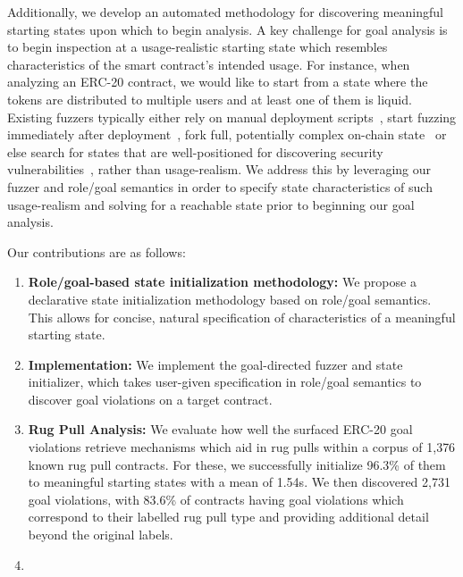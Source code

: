 Additionally, we develop an automated methodology for discovering meaningful starting states upon which to begin analysis.
A key challenge for goal analysis is to begin inspection at a usage-realistic starting state which resembles characteristics of the smart contract's intended usage.
For instance, when analyzing an ERC-20 contract, we would like to start from a state where the tokens are distributed to multiple users and at least one of them is liquid.
Existing fuzzers typically either
    rely on manual deployment scripts~\cite{foundry_fuzz,echidna},
    start fuzzing immediately after deployment~\cite{sfuzz_icse20,contractfuzzer_2018,echidna},
    fork full, potentially complex on-chain state~\cite{echidna,medusa,ityfuzz_issta23}
    or else search for states that are well-positioned for discovering security vulnerabilities~\cite{smartian_ase21,ConFuzzius_eurosp21,ityfuzz_issta23}, rather than usage-realism.
We address this by leveraging our fuzzer and role/goal semantics in order to specify state characteristics of such usage-realism and solving for a reachable
state prior to beginning our goal analysis.

Our contributions are as follows:
\begin{enumerate}
    \item \textbf{Role/goal-based state initialization methodology:}
        We propose a declarative state initialization methodology based on role/goal semantics.
        This allows for concise, natural specification of characteristics of a meaningful starting state.
    \item \textbf{\spoilsport Implementation:}
        We implement the \spoilsport{} goal-directed fuzzer and state initializer, which takes user-given specification in role/goal semantics to discover goal violations on a target contract.
    \item \textbf{Rug Pull Analysis:}
        We evaluate how well the surfaced ERC-20 goal violations retrieve mechanisms which aid in rug pulls within a corpus of 1,376 known rug pull contracts.
        For these, we successfully initialize 96.3\% of them to meaningful starting states with a mean of 1.54s.
        We then discovered 2,731 goal violations, with 83.6\% of contracts having goal violations which correspond to their labelled rug pull type and providing additional detail beyond the original labels.
    \item {}
\end{enumerate}
